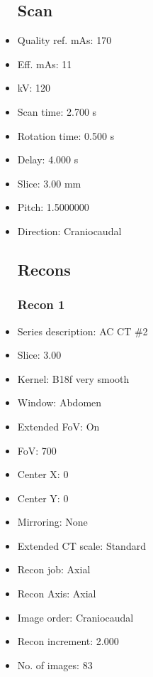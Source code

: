 \documentclass[12pt]{article}
\begin{document}
\begin{itemize}
\subsection{Scan}
\item Quality ref. mAs: 170\item Eff. mAs: 11\item kV: 120\item Scan time: 2.700 s\item Rotation time: 0.500 s\item Delay: 4.000 s\item Slice: 3.00 mm\item Pitch: 1.5000000\item Direction: Craniocaudal\subsection{Recons}

\subsubsection{Recon 1}
\item Series description: AC CT \#2
\item Slice: 3.00
\item Kernel: B18f very smooth
\item Window: Abdomen
\item Extended FoV: On
\item FoV: 700
\item Center X: 0
\item Center Y: 0
\item Mirroring: None
\item Extended CT scale: Standard
\item Recon job: Axial
\item Recon Axis: Axial
\item Image order: Craniocaudal
\item Recon increment: 2.000
\item No. of images: 83
\end{itemize}
\end{document}
